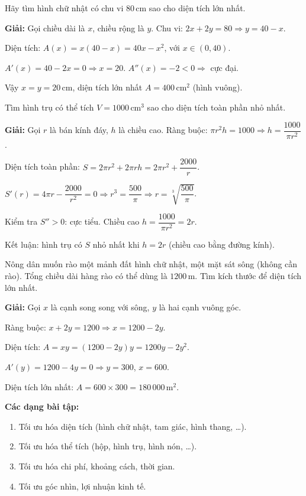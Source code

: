 \documentclass[12pt,a4paper]{article}
\begin{document}
\begin{vidu}
  Hãy tìm hình chữ nhật có chu vi $80\,\text{cm}$ sao cho diện tích lớn nhất.

  \medskip\textbf{Giải:}
  Gọi chiều dài là $x$, chiều rộng là $y$. Chu vi: $2x + 2y = 80 \Rightarrow y = 40 - x$.

  Diện tích: $A(x) = x(40 - x) = 40x - x^2$, với $x \in (0, 40)$.

  $A'(x) = 40 - 2x = 0 \Rightarrow x = 20$. $A''(x) = -2 < 0 \Rightarrow$ cực đại.

  Vậy $x = y = 20\,\text{cm}$, diện tích lớn nhất $A = 400\,\text{cm}^2$ (hình vuông).
\end{vidu}

\begin{vidu}
  Tìm hình trụ có thể tích $V = 1000\,\text{cm}^3$ sao cho diện tích toàn phần nhỏ nhất.

  \medskip\textbf{Giải:}
  Gọi $r$ là bán kính đáy, $h$ là chiều cao. Ràng buộc: $\pi r^2 h = 1000 \Rightarrow h = \dfrac{1000}{\pi r^2}$.

  Diện tích toàn phần: $S = 2\pi r^2 + 2\pi r h = 2\pi r^2 + \dfrac{2000}{r}$.

  $S'(r) = 4\pi r - \dfrac{2000}{r^2} = 0 \Rightarrow r^3 = \dfrac{500}{\pi} \Rightarrow r = \sqrt[3]{\dfrac{500}{\pi}}$.

  Kiểm tra $S'' > 0$: cực tiểu. Chiều cao $h = \dfrac{1000}{\pi r^2} = 2r$.

  Kết luận: hình trụ có $S$ nhỏ nhất khi $h = 2r$ (chiều cao bằng đường kính).
\end{vidu}

\begin{vidu}
  Nông dân muốn rào một mảnh đất hình chữ nhật, một mặt sát sông (không cần rào). Tổng chiều dài hàng rào có thể dùng là $1200\,\text{m}$. Tìm kích thước để diện tích lớn nhất.

  \medskip\textbf{Giải:}
  Gọi $x$ là cạnh song song với sông, $y$ là hai cạnh vuông góc.

  Ràng buộc: $x + 2y = 1200 \Rightarrow x = 1200 - 2y$.

  Diện tích: $A = xy = (1200 - 2y)y = 1200y - 2y^2$.

  $A'(y) = 1200 - 4y = 0 \Rightarrow y = 300$, $x = 600$.

  Diện tích lớn nhất: $A = 600 \times 300 = 180\,000\,\text{m}^2$.
\end{vidu}

\medskip\noindent\textbf{Các dạng bài tập:}
\begin{enumerate}[label=\textbf{Dạng \arabic*:}, leftmargin=*, align=left]
  \item Tối ưu hóa diện tích (hình chữ nhật, tam giác, hình thang, \ldots).
  \item Tối ưu hóa thể tích (hộp, hình trụ, hình nón, \ldots).
  \item Tối ưu hóa chi phí, khoảng cách, thời gian.
  \item Tối ưu góc nhìn, lợi nhuận kinh tế.
\end{enumerate}
\end{document}
